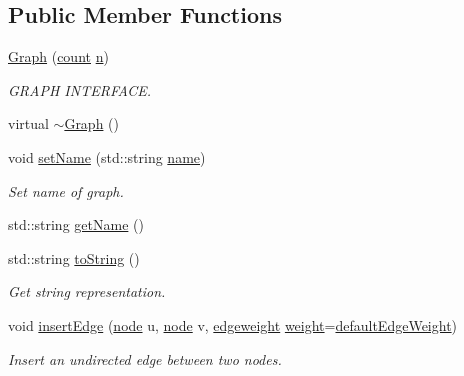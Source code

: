\subsection*{Public Member Functions}
\begin{DoxyCompactItemize}
\item 
\hyperlink{class_networ_kit_1_1_graph_aba688511045b476df066431fd797333b}{Graph} (\hyperlink{namespace_networ_kit_ad4c536a5339a8bf2f91f418b9a67a7d8}{count} \hyperlink{class_networ_kit_1_1_graph_aae05e611d6d5eb42e045d374d73eb34a}{n})
\begin{DoxyCompactList}\small\item\em G\-R\-A\-P\-H I\-N\-T\-E\-R\-F\-A\-C\-E. \end{DoxyCompactList}\item 
virtual \hyperlink{class_networ_kit_1_1_graph_a95159535740c13622832bd95cf04e553}{$\sim$\-Graph} ()
\item 
void \hyperlink{class_networ_kit_1_1_graph_ac40cbd88c3a2b65d33ce74236b805666}{set\-Name} (std\-::string \hyperlink{class_networ_kit_1_1_graph_aad1c9901bb8b7493df628469be54300a}{name})
\begin{DoxyCompactList}\small\item\em Set name of graph. \end{DoxyCompactList}\item 
std\-::string \hyperlink{class_networ_kit_1_1_graph_a51d60896a8ae08301cf6b2c0161f2c68}{get\-Name} ()
\item 
std\-::string \hyperlink{class_networ_kit_1_1_graph_a1ec9e68347696937a5d98d2b0bd610b3}{to\-String} ()
\begin{DoxyCompactList}\small\item\em Get string representation. \end{DoxyCompactList}\item 
void \hyperlink{class_networ_kit_1_1_graph_ac6c882c23df62222dab60887114c0b6a}{insert\-Edge} (\hyperlink{namespace_networ_kit_a61914158fd771265be48de9942369160}{node} u, \hyperlink{namespace_networ_kit_a61914158fd771265be48de9942369160}{node} v, \hyperlink{namespace_networ_kit_a831b108dbcd79dad062d9e28b1b4e3dd}{edgeweight} \hyperlink{class_networ_kit_1_1_graph_a4cc21c97791b60088e735ef0c36583b8}{weight}=\hyperlink{class_networ_kit_1_1_graph_af32663b9ad67bae546281e7725db3519}{default\-Edge\-Weight})
\begin{DoxyCompactList}\small\item\em Insert an undirected edge between two nodes. \end{DoxyCompactList}\item 

\end{DoxyCompactItemize}

